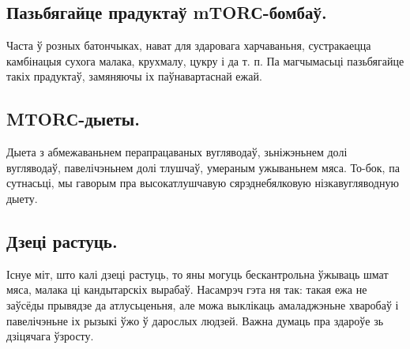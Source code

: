 \subsection{Пазьбягайце прадуктаў mTORС-бомбаў.}
Часта ў розных батончыках, нават для здаровага харчаваньня, сустракаецца камбінацыя сухога малака, крухмалу, цукру і да т. п. Па магчымасьці пазьбягайце такіх прадуктаў, замяняючы іх паўнавартаснай ежай.

\subsection{MTORС-дыеты.}
Дыета з абмежаваньнем перапрацаваных вугляводаў, зьніжэньнем долі вугляводаў, павелічэньнем долі тлушчаў, умераным ужываньнем мяса. То-бок, па сутнасьці, мы гаворым пра высокатлушчавую сярэднебялковую нізкавугляводную дыету.

\subsection{Дзеці растуць.}
Існуе міт, што калі дзеці растуць, то яны могуць бескантрольна ўжываць шмат мяса, малака ці кандытарскіх вырабаў. Насамрэч гэта ня так: такая ежа не заўсёды прывядзе да атлусьценьня, але можа выклікаць амаладжэньне хваробаў і павелічэньне іх рызыкі ўжо ў дарослых людзей. Важна думаць пра здароўе зь дзіцячага ўзросту.
